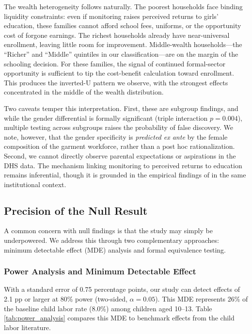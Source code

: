\documentclass[12pt]{article}
\begin{document}
The wealth heterogeneity follows naturally. The poorest households face binding liquidity constraints: even if monitoring raises perceived returns to girls' education, these families cannot afford school fees, uniforms, or the opportunity cost of forgone earnings. The richest households already have near-universal enrollment, leaving little room for improvement. Middle-wealth households---the ``Richer'' and ``Middle'' quintiles in our classification---are on the margin of the schooling decision. For these families, the signal of continued formal-sector opportunity is sufficient to tip the cost-benefit calculation toward enrollment. This produces the inverted-U pattern we observe, with the strongest effects concentrated in the middle of the wealth distribution.

Two caveats temper this interpretation. First, these are subgroup findings, and while the gender differential is formally significant (triple interaction $p = 0.004$), multiple testing across subgroups raises the probability of false discovery. We note, however, that the gender specificity is \textit{predicted ex ante} by the female composition of the garment workforce, rather than a post hoc rationalization. Second, we cannot directly observe parental expectations or aspirations in the DHS data. The mechanism linking monitoring to perceived returns to education remains inferential, though it is grounded in the empirical findings of \citet{HeathMobarak2015} in the same institutional context.

\subsection{Precision of the Null Result}

A common concern with null findings is that the study may simply be underpowered. We address this through two complementary approaches: minimum detectable effect (MDE) analysis and formal equivalence testing.

\subsubsection{Power Analysis and Minimum Detectable Effect}

With a standard error of 0.75 percentage points, our study can detect effects of 2.1 pp or larger at 80\% power (two-sided, $\alpha = 0.05$). This MDE represents 26\% of the baseline child labor rate (8.0\%) among children aged 10--13. Table \ref{tab:power_analysis} compares this MDE to benchmark effects from the child labor literature.
\end{document}
